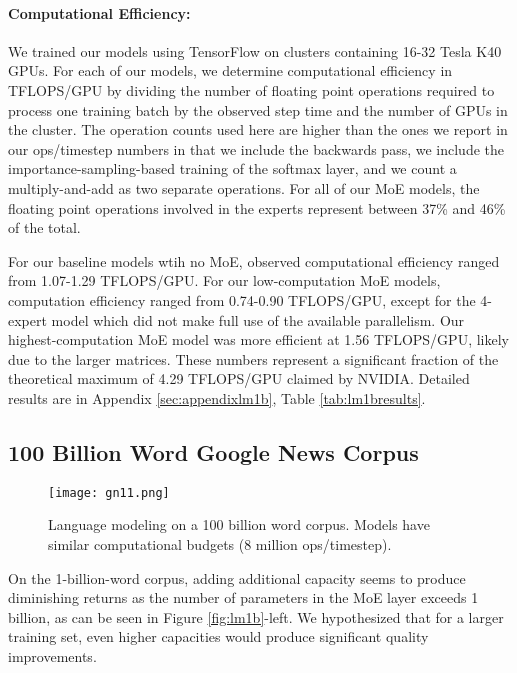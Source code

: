 \documentclass{article} %
\begin{document}
\paragraph{Computational Efficiency:} We trained our models using TensorFlow \citep{Abadi16} on clusters containing 16-32 Tesla K40 GPUs.  For each of our models, we determine computational efficiency in TFLOPS/GPU by dividing the number of floating point operations required to process one training batch by the observed step time and the number of GPUs in the cluster.  The operation counts used here are higher than the ones we report in our ops/timestep numbers in that we include the backwards pass, we include the importance-sampling-based training of the softmax layer, and we count a multiply-and-add as two separate operations.  For all of our MoE models, the floating point operations involved in the experts represent between 37\% and 46\% of the total. 

For our baseline models wtih no MoE, observed computational efficiency ranged from 1.07-1.29 TFLOPS/GPU.  For our low-computation MoE models, computation efficiency ranged from 0.74-0.90 TFLOPS/GPU, except for the 4-expert model which did not make full use of the available parallelism.  Our highest-computation MoE model was more efficient at 1.56 TFLOPS/GPU, likely due to the larger matrices.   These numbers represent a significant fraction of the theoretical maximum of 4.29 TFLOPS/GPU claimed by NVIDIA.  Detailed results are in Appendix \ref{sec:appendixlm1b}, Table \ref{tab:lm1bresults}. 



\subsection{100 Billion Word Google News Corpus}


\begin{figure}[h!]
\centering
\texttt{[image: gn11.png]}
\caption{Language modeling on a 100 billion word corpus.  Models have similar computational budgets (8 million ops/timestep).}
\label{fig:gn11}
\end{figure}

On the 1-billion-word corpus, adding additional capacity seems to produce diminishing returns as the number of parameters in the MoE layer exceeds 1 billion, as can be seen in Figure \ref{fig:lm1b}-left.   We hypothesized that for a larger training set, even higher capacities would produce significant quality improvements.
\end{document}
